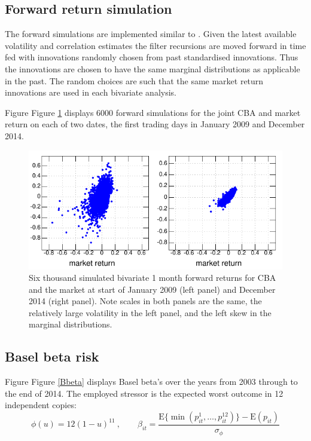 \documentclass[authoryear]{elsarticle}
\newcommand{\E}{\mathrm{E}}
\newcommand{\fref}[1]{Figure \ref{#1}}
\newcommand{\cq}{\ , \qquad}
\begin{document}
\subsection{Forward return simulation}

The forward simulations are implemented similar to \cite{brownlees2015}.   Given the latest available volatility and correlation estimates the filter recursions are moved forward in time fed with innovations randomly chosen from past standardised innovations.  Thus the innovations are chosen to have the same marginal distributions as applicable in the past.  The random choices are such  that the same market return innovations are used in each bivariate analysis.   

Figure \fref{simulation} displays  6000 forward simulations for the joint CBA and market return on each of  two dates, the first trading days in January 2009 and December 2014. 

\begin{figure}[htbp]
\begin{center}
\includegraphics{simulation.pdf}
\caption{Six thousand simulated bivariate 1 month forward returns for CBA and the market at start of January 2009 (left panel)  and December 2014 (right panel). Note scales in both panels are the same, the relatively large volatility in the left panel, and the left skew in the  marginal distributions.}
\label{simulation}
\end{center}
\end{figure}

\subsection{Basel beta risk}

Figure \fref{Bbeta} displays Basel beta's over the years from 2003 through to the end of 2014.  The employed stressor is the expected worst outcome in 12 independent copies:
$$
\phi(u) = 12(1-u)^{11}\cq \beta_{it} = \frac{\E\{\min(p^1_{it},\ldots,p^{12}_{it})\}-\E(p_{it})}{\sigma_\phi}
$$
\end{document}
